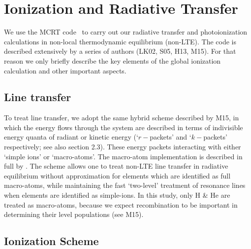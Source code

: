 \documentclass[preprint, a4paper, 11pt]{aastex}
\begin{document}










\section{Ionization and Radiative Transfer}

We use the MCRT code \py\ to carry out our radiative transfer and photoionization
calculations in non-local thermodynamic equilibrium (non-LTE). 
The code is described extensively by a series of authors (LK02, S05, H13, M15).
For that reason we only briefly describe the key elements of the global 
ionization calculation and other important aspects.

\subsection{Line transfer}

To treat line transfer, we adopt the same hybrid scheme 
described by M15, 
in which the energy flows
through the system are described in terms of indivisible
energy quanta of radiant or kinetic energy 
(`$r-$packets' and `$k-$packets' respectively; see also section 2.3).
These energy packets interacting with either `simple ions'
or `macro-atoms'. The macro-atom implementation 
is described in full by \cite{lucy2002, lucy2003}.
The scheme allows one to treat non-LTE line transfer in radiative equilibrium
without approximation for elements which are identified as 
full macro-atoms, while maintaining the fast `two-level' 
treatment of resonance lines when elements are identified 
as simple-ions. In this study,
only H \& He are treated as macro-atoms, because 
we expect recombination to be important
in determining their level populations (see M15).

\subsection{Ionization Scheme}
\end{document}
